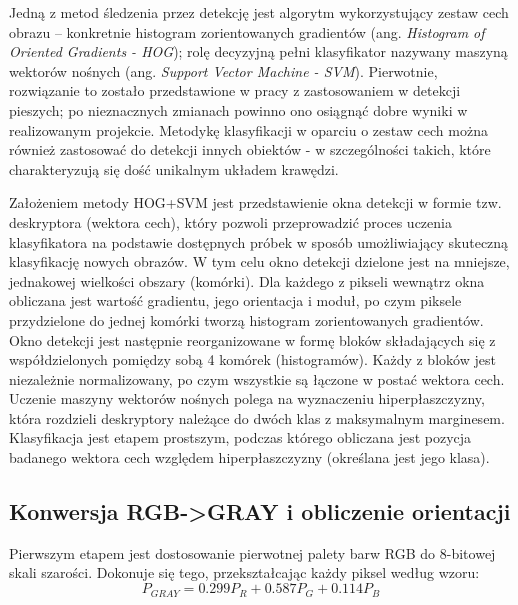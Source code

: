 Jedną z metod śledzenia przez detekcję jest algorytm wykorzystujący zestaw cech obrazu -- konkretnie histogram zorientowanych gradientów (ang. \textit{Histogram of Oriented Gradients - HOG}); rolę decyzyjną pełni klasyfikator nazywany maszyną wektorów nośnych (ang. \textit{Support Vector Machine - SVM}). %
Pierwotnie, rozwiązanie to zostało przedstawione w pracy \cite{Dalal} z zastosowaniem w detekcji pieszych; po nieznacznych zmianach powinno ono osiągnąć dobre wyniki w realizowanym projekcie. %
Metodykę klasyfikacji w oparciu o zestaw cech można również zastosować do detekcji innych obiektów - w szczególności takich, które charakteryzują się dość unikalnym układem krawędzi.

Założeniem metody HOG+SVM jest przedstawienie okna detekcji w formie tzw. deskryptora (wektora cech), który pozwoli przeprowadzić proces uczenia klasyfikatora na podstawie dostępnych próbek w sposób umożliwiający skuteczną klasyfikację nowych obrazów. W tym celu okno detekcji dzielone jest na mniejsze, jednakowej wielkości obszary (komórki). Dla każdego z pikseli wewnątrz okna obliczana jest wartość gradientu, jego orientacja i moduł, po czym piksele przydzielone do jednej komórki tworzą histogram zorientowanych gradientów. Okno detekcji jest następnie reorganizowane w formę bloków składających się z współdzielonych pomiędzy sobą 4 komórek (histogramów). Każdy z bloków jest niezależnie normalizowany, po czym wszystkie są łączone w postać wektora cech.\newline
Uczenie maszyny wektorów nośnych polega na wyznaczeniu hiperpłaszczyzny, która rozdzieli deskryptory należące do dwóch klas z maksymalnym marginesem. Klasyfikacja jest etapem prostszym, podczas którego obliczana jest pozycja badanego wektora cech względem hiperpłaszczyzny (określana jest jego klasa).


\subsection{Konwersja RGB->GRAY i obliczenie orientacji} %
\label{sec:HOGgrad}
Pierwszym etapem jest dostosowanie pierwotnej palety barw RGB do 8-bitowej skali szarości. 
Dokonuje się tego, przekształcając każdy piksel według wzoru:
\begin{equation}
\label{eq:rgb2gray}
P_{GRAY}=0.299P_R + 0.587P_G + 0.114P_B 
\end{equation}

